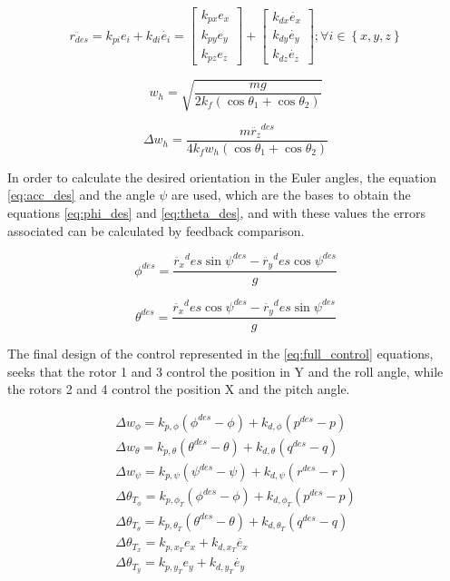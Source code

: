 \documentclass[a4paper, 12pt, oneside]{book}
\begin{document}
\begin{equation}
\ddot{r_{des}}=k_{pi}e_i+k_{di}\dot{e_i}=
\begin{bmatrix}
k_{px}e_x\\ 
k_{py}e_y\\ 
k_{pz}e_z
\end{bmatrix}
+
\begin{bmatrix}
k_{dx}\dot{e_x}\\ 
k_{dy}\dot{e_y}\\ 
k_{dz}\dot{e_z}
\end{bmatrix}
;
\forall i \in \left \{ x, y, z \right \}
\label{eq:acc_des}
\end{equation}

\begin{equation}
w_h=\sqrt{\frac{mg}{2k_f(\cos\theta_1+\cos\theta_2)}}
\label{eq:w}
\end{equation}

\begin{equation}
\Delta w_h=\frac{m\ddot{r_z}^{des}}{4k_fw_h(\cos\theta_1+\cos\theta_2)}
\label{eq:dw}
\end{equation}

In order to calculate the desired orientation in the Euler angles, the equation \ref{eq:acc_des} and the angle $\psi$ are used, which are the bases to obtain the equations \ref{eq:phi_des} and \ref{eq:theta_des}, and with these values the errors associated can be calculated by feedback comparison.

\begin{equation}
\phi^{des}=\frac{\ddot{r_x}^des\sin\psi^{des}-\ddot{r_y}^des\cos\psi^{des}}{g}
\label{eq:phi_des}
\end{equation}

\begin{equation}
\theta^{des}=\frac{\ddot{r_x}^des\cos\psi^{des}-\ddot{r_y}^des\sin\psi^{des}}{g}
\label{eq:theta_des}
\end{equation}

The final design of the control represented in the \ref{eq:full_control} equations, seeks that the rotor 1 and 3 control the position in Y and the roll angle, while the rotors 2 and 4 control the position X and the pitch angle.

\begin{equation}
\begin{split}
\Delta w_\phi=k_{p,\phi}(\phi^{des}-\phi)+k_{d,\phi}(p^{des}-p)\\
\Delta w_\theta=k_{p,\theta}(\theta^{des}-\theta)+k_{d,\theta}(q^{des}-q)\\
\Delta w_\psi=k_{p,\psi}(\psi^{des}-\psi)+k_{d,\psi}(r^{des}-r)\\
\Delta \theta_{T_\phi}=k_{p,\phi_T}(\phi^{des}-\phi)+k_{d,\phi_T}(p^{des}-p)\\
\Delta \theta_{T_\theta}=k_{p,\theta_T}(\theta^{des}-\theta)+k_{d,\theta_T}(q^{des}-q)\\
\Delta \theta_{T_x}=k_{p,x_T}e_x+k_{d,x_T}\dot{e_x}\\
\Delta \theta_{T_y}=k_{p,y_T}e_y+k_{d,y_T}\dot{e_y}
\end{split}
\label{eq:full_control}
\end{equation}
\end{document}
